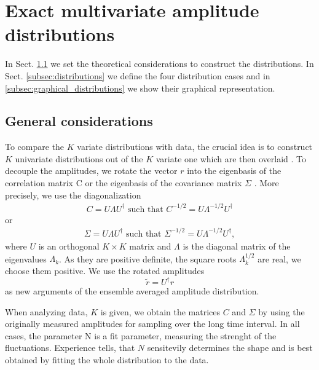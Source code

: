 \section{Exact multivariate amplitude distributions}
\label{sec:exact_distributions}


In Sect. \ref{subsec:general_considerations} we set the theoretical considerations
to construct the distributions. In Sect.  \ref{subsec:distributions} we define the
four distribution cases and in \ref{subsec:graphical_distributions} we show
their graphical representation.

\subsection{General considerations}\label{subsec:general_considerations}

To compare the $K$ variate distributions with data, the crucial idea is to
construct $K$ univariate distributions out of the $K$ variate one which are
then overlaid \cite{exact_distributions_guhr}. To decouple the amplitudes, we
rotate the vector $r$ into the eigenbasis of the correlation matrix C or the
eigenbasis of the covariance matrix $\Sigma$
\cite{non_stationarity_fin_guhr,exact_distributions_guhr}. More precisely, we
use the diagonalization
\begin{align}
    C = U \Lambda U^{\dagger} \text{ such that }
    C^{-1/2} = U \Lambda^{-1/2} U^{\dagger}
\end{align}
or
\begin{align}
    \Sigma = U \Lambda U^{\dagger} \text{ such that }
    \Sigma^{-1/2} = U \Lambda^{-1/2} U^{\dagger},
\end{align}
where $U$ is an orthogonal $K \times K$ matrix and $\Lambda$ is the diagonal
matrix of the eigenvalues $\Lambda_{k}$. As they are positive definite, the
square roots $\Lambda_{k}^{1/2}$ are real, we choose them positive. We use the
rotated amplitudes
\begin{equation}
    \tilde{r} = U^{\dagger} r
\end{equation}
as new arguments of the ensemble averaged amplitude distribution.

When analyzing data, $K$ is given, we obtain the matrices $C$ and $\Sigma$ by
using the originally measured amplitudes for sampling over the long time interval.
In all cases, the parameter N is a fit parameter, measuring the strenght of the
fluctuations. Experience tells, that $N$ sensitevily determines the shape and is
best obtained by fitting the whole distribution to the data.

